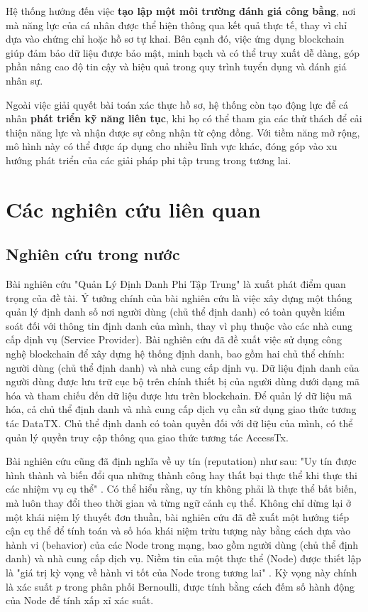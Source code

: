 Hệ thống hướng đến việc \textbf{tạo lập một môi trường đánh giá công bằng}, nơi mà năng lực của cá nhân được thể hiện thông qua kết quả thực tế,
thay vì chỉ dựa vào chứng chỉ hoặc hồ sơ tự khai. Bên cạnh đó, việc ứng dụng blockchain giúp đảm bảo dữ liệu được bảo mật,
minh bạch và có thể truy xuất dễ dàng, góp phần nâng cao độ tin cậy và hiệu quả trong quy trình tuyển dụng và đánh giá nhân sự.

Ngoài việc giải quyết bài toán xác thực hồ sơ, hệ thống còn tạo động lực để cá nhân \textbf{phát triển kỹ năng liên tục}, khi họ có thể tham gia các thử thách
để cải thiện năng lực và nhận được sự công nhận từ cộng đồng. Với tiềm năng mở rộng, mô hình này có thể được áp dụng cho nhiều lĩnh vực khác,
đóng góp vào xu hướng phát triển của các giải pháp phi tập trung trong tương lai.

\section{Các nghiên cứu liên quan}

\subsection{Nghiên cứu trong nước}

Bài nghiên cứu "Quản Lý Định Danh Phi Tập Trung" \cite{quan-ly-dinh-danh-phi-tap-trung} là xuất phát điểm quan trọng của đề tài.
Ý tưởng chính của bài nghiên cứu là việc xây dựng một thống quản lý định danh số nơi người dùng (chủ thể định danh) có toàn quyền kiểm soát đối với thông tin định danh của mình,
thay vì phụ thuộc vào các nhà cung cấp dịnh vụ (Service Provider).
Bài nghiên cứu đã đề xuất việc sử dụng công nghệ blockchain để xây dựng hệ thống định danh, bao gồm hai chủ thể chính:
người dùng (chủ thể định danh) và nhà cung cấp dịnh vụ. Dữ liệu định danh của người dùng được lưu trữ cục bộ trên chính thiết bị của người dùng dưới dạng mã hóa
và tham chiếu đến dữ liệu được lưu trên blockchain.
Để quản lý dữ liệu mã hóa, cả chủ thể định danh và nhà cung cấp dịch vụ cần sử dụng giao thức tương tác DataTX. Chủ thể định danh có toàn quyền đối với dữ liệu của mình,
có thể quản lý quyền truy cập thông qua giao thức tương tác AccessTx.

Bài nghiên cứu cũng đã định nghĩa về uy tín (reputation) như sau: "Uy tín được hình thành và biến đổi qua những thành công hay thất bại
thực thể khi thực thi các nhiệm vụ cụ thể" \cite{quan-ly-dinh-danh-phi-tap-trung,a-survey-of-trust-in-internet-applications}.
Có thể hiểu rằng, uy tín không phải là thực thể bất biến, mà luôn thay đổi theo thời gian và từng ngữ cảnh cụ thể.
Không chỉ dừng lại ở một khái niệm lý thuyết đơn thuần, bài nghiên cứu đã đề xuất một hướng tiếp cận cụ thể để tính toán
và số hóa khái niệm trừu tượng này bằng cách dựa vào hành vi (behavior) của các Node trong mạng, bao gồm người dùng (chủ thể định danh)
và nhà cung cấp dịch vụ. Niềm tin của một thực thể (Node) được thiết lập là "giá trị kỳ vọng về hành vi tốt của Node trong tương lai" \cite{quan-ly-dinh-danh-phi-tap-trung}.
Kỳ vọng này chính là xác suất \(p\) trong phân phối Bernoulli, được tính bằng cách đếm số hành động của Node để tính xấp xỉ xác suất. \cite{thong-ke-may-tinh,quan-ly-dinh-danh-phi-tap-trung}

